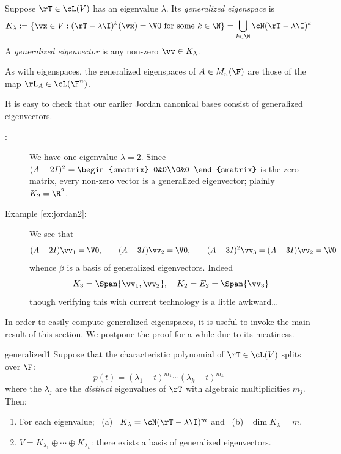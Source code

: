\begin{defn}{}{}
Suppose $\rT\in\cL(V)$ has an eigenvalue $\lambda$. Its \emph{generalized eigenspace} is
\[K_\lambda:=\{\vx\in V:(\rT-\lambda \I)^k(\vx)=\V0\text{ for some }k\in\N\}=\bigcup_{k\in\N}\cN(\rT-\lambda\I)^k\]
A \emph{generalized eigenvector} is any non-zero $\vv\in K_\lambda$.
\end{defn}

As with eigenspaces, the generalized eigenspaces of $A\in M_n(\F)$ are those of the map $\rL_A\in\cL(\F^n)$.\smallbreak

\begin{tcolorbox}[exstyle]
It is easy to check that our earlier Jordan canonical bases consist of generalized eigenvectors.
\begin{description}
  \item[:] We have one eigenvalue $\lambda=2$. Since $(A-2I)^2=\begin{smatrix}
  0&0\\0&0
  \end{smatrix}$ is the zero matrix, every non-zero vector is a generalized eigenvector; plainly $K_2=\R^2$.

  \item[\normalfont Example \ref{ex:jordan2}:] We see that
  \[(A-2I)\vv_1=\V0,\qquad (A-3I)\vv_2=\V0,\qquad (A-3I)^2\vv_3=(A-3I)\vv_2=\V0\]
  whence $\beta$ is a basis of generalized eigenvectors. Indeed
  \[K_3=\Span\{\vv_1,\vv_2\},\quad K_2=E_2=\Span\{\vv_3\}\]
  though verifying this with current technology is a little awkward\ldots
\end{description}
\end{tcolorbox}

\goodbreak

In order to easily compute generalized eigenspaces, it is useful to invoke the main result of this section. We postpone the proof for a while due to its meatiness.

\begin{thm}{}{generalized1}
Suppose that the characteristic polynomial of $\rT\in\cL(V)$ splits over $\F$:
\[p(t)=(\lambda_1-t)^{m_1}\cdots (\lambda_k-t)^{m_k}\]
where the $\lambda_j$ are the \emph{distinct} eigenvalues of $\rT$ with algebraic multiplicities $m_j$. Then:
\begin{enumerate}\itemsep0pt
  \item For each eigenvalue; \ (a) \ $K_{\lambda}=\cN(\rT-\lambda \I)^{m}$ and \ (b) \ $\dim K_{\lambda}=m$.
	\item $V=K_{\lambda_1}\oplus\cdots\oplus K_{\lambda_k}$: there exists a basis of generalized eigenvectors.
\end{enumerate}
\end{thm}

